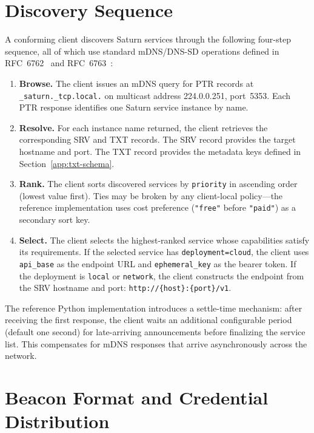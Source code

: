 \section{Discovery Sequence}
\label{app:discovery}

A conforming client discovers Saturn services through the following four-step sequence, all of which use standard mDNS/DNS-SD operations defined in RFC~6762~\cite{rfc6762} and RFC~6763~\cite{rfc6763}:

\begin{enumerate}
  \item \textbf{Browse.} The client issues an mDNS query for PTR records at \texttt{\_saturn.\_tcp.local.} on multicast address 224.0.0.251, port~5353. Each PTR response identifies one Saturn service instance by name.

  \item \textbf{Resolve.} For each instance name returned, the client retrieves the corresponding SRV and TXT records. The SRV record provides the target hostname and port. The TXT record provides the metadata keys defined in Section~\ref{app:txt-schema}.

  \item \textbf{Rank.} The client sorts discovered services by \texttt{priority} in ascending order (lowest value first). Ties may be broken by any client-local policy---the reference implementation uses cost preference (\texttt{"free"} before \texttt{"paid"}) as a secondary sort key.

  \item \textbf{Select.} The client selects the highest-ranked service whose capabilities satisfy its requirements. If the selected service has \texttt{deployment=cloud}, the client uses \texttt{api\_base} as the endpoint URL and \texttt{ephemeral\_key} as the bearer token. If the deployment is \texttt{local} or \texttt{network}, the client constructs the endpoint from the SRV hostname and port: \texttt{http://\{host\}:\{port\}/v1}.
\end{enumerate}

The reference Python implementation introduces a settle-time mechanism: after receiving the first response, the client waits an additional configurable period (default one second) for late-arriving announcements before finalizing the service list. This compensates for mDNS responses that arrive asynchronously across the network.

\section{Beacon Format and Credential Distribution}
\label{app:beacons}

